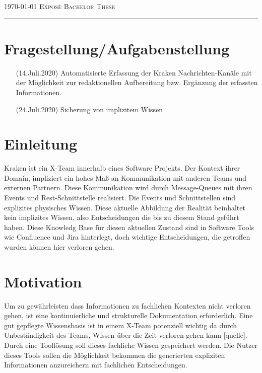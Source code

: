 \documentclass[12pt,reqno]{amsart}
\begin{document}
\thispagestyle{empty}

{\scshape \today} \hfill {\scshape \large Exposè} \hfill {\scshape Bachelor These}
 
\smallskip

\hrule

\section*{ Fragestellung/Aufgabenstellung}

\bigskip

\begin{itemize}
\item[(14.Juli.2020)] Automatisierte Erfassung der Kraken Nachrichten-Kanäle mit der Möglichkeit zur redaktionellen Aufbereitung bzw. Ergänzung der erfassten Informationen.
\item[(24.Juli.2020)] Sicherung von implizitem Wissen 
\end{itemize}

\bigskip


\section*{ Einleitung }

Kraken ist ein X-Team innerhalb eines Software Projekts. Der Kontext ihrer Domain, impliziert ein hohes Maß an Kommunikation mit anderen Teams und externen Partnern. Diese Kommunikation wird durch Message-Queues mit ihren Events und Rest-Schnittstelle realisiert. Die Events und Schnittstellen sind explizites physisches Wissen. Diese aktuelle Abbildung der Realität beinhaltet kein implizites Wissen, also Entscheidungen die bis zu diesem Stand geführt haben. Diese Knowledg Base für diesen aktuellen Zustand sind in Software Tools wie Confluence und Jira hinterlegt, doch wichtige Entscheidungen, die getroffen wurden können hier verloren gehen. 

\bigskip
\section*{Motivation}

Um zu gewährleisten dass Informationen zu fachlichen Kontexten nicht verloren gehen, ist eine kontinuierliche und strukturelle Dokumentation erforderlich. Eine gut gepflegte Wissensbasis ist in einem X-Team potenziell wichtig da durch Unbeständigkeit des Teams, Wissen über die Zeit verloren gehen kann [quelle]. Durch eine Toollösung soll dieses fachliche Wissen gespeichert werden. Die Nutzer dieses Tools sollen die Möglichkeit bekommen die generierten expliziten Informationen anzureichern mit fachlichen Entscheidungen.
\end{document}
